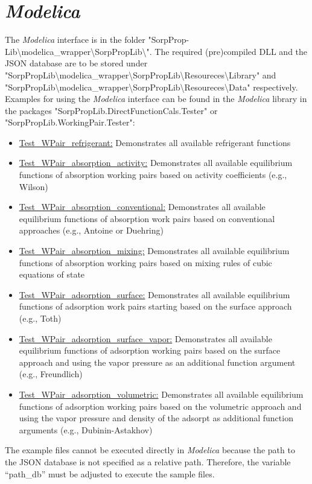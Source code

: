 \section{\textit{Modelica}}
\label{cha:usage:modelica}
%
The \textit{Modelica} interface is in the folder "SorpProp-Lib\textbackslash modelica\_wrapper\textbackslash SorpPropLib\textbackslash ". The required (pre)compiled DLL and the JSON database are to be stored under "SorpPropLib\textbackslash modelica\_wrapper\textbackslash SorpPropLib\textbackslash Resoureces\textbackslash Library" and "SorpPropLib\textbackslash modelica\_wrapper\textbackslash SorpPropLib\textbackslash Resoureces\textbackslash Data" respectively. Examples for using the \textit{Modelica} interface can be found in the \textit{Modelica} library in the packages "SorpPropLib.DirectFunctionCals.Tester" or "SorpPropLib.WorkingPair.Tester":
\begin{itemize}
	\item \underline{Test\_WPair\_refrigerant:} Demonstrates all available refrigerant functions
	\item \underline{Test\_WPair\_absorption\_activity:} Demonstrates all available equilibrium functions of absorption working pairs based on activity coefficients (e.g., Wilson)
	\item \underline{Test\_WPair\_absorption\_conventional:} Demonstrates all available equilibrium functions of absorption work pairs based on conventional approaches (e.g., Antoine or Duehring)
	\item \underline{Test\_WPair\_absorption\_mixing:} Demonstrates all available equilibrium functions of absorption working pairs based on mixing rules of cubic equations of state
	\item \underline{Test\_WPair\_adsorption\_surface:} Demonstrates all available equilibrium functions of adsorption work pairs starting based on the surface approach (e.g., Toth)
	\item \underline{Test\_WPair\_adsorption\_surface\_vapor:} Demonstrates all available equilibrium functions of adsorption working pairs based on the surface approach and using the vapor pressure as an additional function argument (e.g., Freundlich)
	\item \underline{Test\_WPair\_adsorption\_volumetric:} Demonstrates all available equilibrium functions of adsorption working pairs based on the volumetric approach and using the vapor pressure and density of the adsorpt as additional function arguments (e.g., Dubinin-Astakhov)
\end{itemize}
The example files cannot be executed directly in \textit{Modelica} because the path to the JSON database is not specified as a relative path. Therefore, the variable “path\_db” must be adjusted to execute the sample files.
